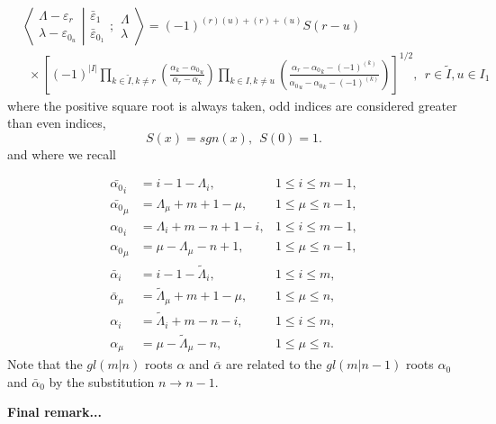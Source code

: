 \documentclass[12pt]{article}
\def\nn{\nonumber}
\begin{document}
\begin{align}
&\left\langle\left. 
\begin{array}{c} \Lambda-\varepsilon_r\\ \lambda-\varepsilon_{0_u} 
 \end{array}
\right|\right.
\left.
\begin{array}{c} \bar{\varepsilon}_1 \\ \bar{\varepsilon}_{0_1} 
 \end{array}
; \begin{array}{c} \Lambda \\ \lambda
 \end{array}
\right\rangle = (-1)^{(r)(u) +(r) + (u)} S(r-u) 
\nn\\
&~~\times
\left[
 (-1)^{|I|} \prod_{k\in \tilde{I},k\neq r} 
\left(
\frac 
{\alpha_k - {\alpha_0}_u  }
{\alpha_r - \alpha_k }
\right)
\prod_{k\in I,k \neq u} 
\left(
\frac
{ \alpha_r - {\alpha_0}_k - (-1)^{(k)} }
{{\alpha_0}_u - {\alpha_0}_k - (-1)^{(k)} }
\right)
\right]^{1/2}
,\ \ r\in \tilde{I},u\in I_1  \label{FinalUnBarredOdd}
\end{align}
where the positive square root is always taken, odd indices are considered greater than even indices, 
$$
S(x) = sgn(x),~~S(0)=1.
$$
and where we recall

\begin{align*}
{\bar{\alpha_0}}_i &= i - 1 -\Lambda_i  , &1\leq i\leq m-1, \\
{\bar{\alpha_0}}_\mu &= \Lambda_\mu + m + 1 - \mu  ,  &1\leq \mu \leq n-1 , \\ 
{\alpha_0}_i &= \Lambda_i + m - n + 1 - i  , &1\leq i\leq m-1, \\
{\alpha_0}_\mu &= \mu - \Lambda_\mu -n + 1, &1\leq \mu \leq n-1 , \\
\bar{\alpha}_i  &= i - 1 -{\tilde{\Lambda}}_i , &1\leq i\leq m, \\
\bar{\alpha}_\mu &= {\tilde{\Lambda}}_\mu + m + 1 - \mu,  &1\leq \mu \leq n , \\
\alpha_i &= {\tilde{\Lambda}}_i + m - n - i, &1\leq i\leq m, \\
\alpha_\mu &= \mu-{\tilde{\Lambda}}_\mu - n, &1\leq \mu \leq n .  
\end{align*}
Note that the $gl(m|n)$ roots $\alpha$ and $\bar{\alpha}$ are related to the $gl(m|n-1)$ roots $\alpha_0$ and $\bar{\alpha}_0$ by the substitution $n \rightarrow n - 1$.

{\bf Final remark...}
\end{document}
